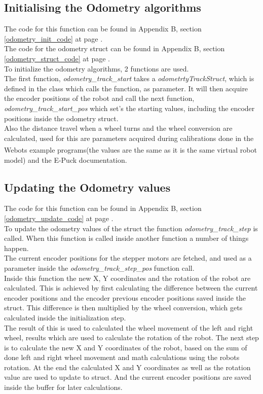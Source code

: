 \subsection{Initialising the Odometry algorithms}
\label{odometry_init_description}
The code for this function can be found in Appendix B, section \ref{odometry_init_code} at page \pageref{odometry_init_code}.\\
The code for the odometry struct can be found in Appendix B, section \ref{odometry_struct_code} at page \pageref{odometry_struct_code}.\\
To initialize the odometry algorithms, 2 functions are used. \\
The first function, \textit{odometry\_track\_start} takes a \textit{odometrtyTrackStruct}, which is defined in the class which calls the function, as parameter. It will then acquire the encoder positions of the robot and call the next function, \textit{odometry\_track\_start\_pos} which set's the starting values, including the encoder positions inside the odometry struct.\\[3ex]


Also the distance travel when a wheel turns and the wheel conversion are calculated, used for this are parameters acquired during calibrations done in the Webots \textsuperscript{\texttrademark} example programs(the values are the same as it is the same virtual robot model) and the E-Puck documentation. 

\subsection{Updating the Odometry values}
\label{odometry_update_description}
The code for this function can be found in Appendix B, section \ref{odometry_update_code} at page \pageref{odometry_update_code}.\\
To update the odometry values of the struct the function \textit{odometry\_track\_step} is called.
When this function is called inside another function a number of things happen.\\
The current encoder positions for the stepper motors are fetched, 
and used as a parameter inside the \textit{odometry\_track\_step\_pos} function call. \\
Inside this function the new X, Y coordinates and the rotation of the robot are calculated. This is achieved by first calculating the difference between the current encoder positions and the encoder previous encoder positions saved inside the struct. 
This difference is then multiplied by the wheel conversion, which gets calculated inside the initialization step. \\
The result of this is used to calculated the wheel movement of the left and right wheel, results which are used to calculate the rotation of the robot. 
The next step is to calculate the new X and Y coordinates of the robot, based on the sum of done left and right wheel movement  and math calculations using the robots rotation. 
At the end the calculated X and Y coordinates as well as the rotation value are used to update to struct. And the current encoder positions are saved inside the buffer for later calculations. 

